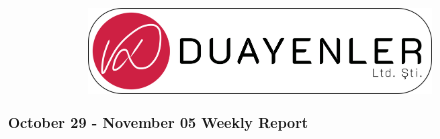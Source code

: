 \documentclass[a4paper,12pt]{article}
\begin{document}
	
\begin{figure}
	\vspace*{-.7cm}
	\centering
	\begin{figure}[H]
		\centering
		\setlength{\unitlength}{\textwidth} 
		\includegraphics[width=0.9\unitlength]{../../../Documents/logos/logo3-with-stroke}
	\end{figure}
\end{figure}
\vspace*{-1.7cm}
\begin{center}
	\Large\textbf{October 29 - November 05 Weekly Report}
	\end{center}
\end{document}
